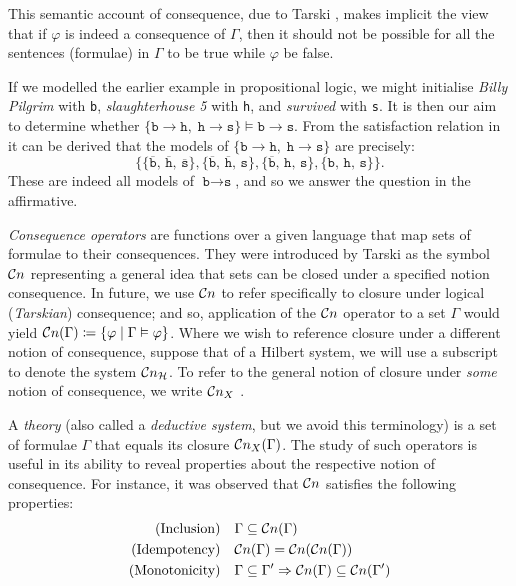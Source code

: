 This semantic account of consequence, due to Tarski , makes implicit the view that if
$\varphi$ is indeed a consequence of $\Gamma$, then it should not be possible for all the sentences (formulae) in $\Gamma$
to be true while $\varphi$ be false.

\begin{example}
	\label{example-logical-consequence} If we modelled the earlier example in propositional logic, we might initialise
	\textit{Billy Pilgrim} with \texttt{b}, \textit{slaughterhouse 5} with \texttt{h}, and \textit{survived} with \texttt{s}.
	It is then our aim to determine whether $\{\texttt{b}\rightarrow \texttt{h},\; \texttt{h}\rightarrow \texttt{s}\} \vDash
	\texttt{b}\rightarrow \texttt{s}$. From the satisfaction relation in  it can be derived
	that the models of $\{\texttt{b}\rightarrow \texttt{h},\; \texttt{h}\rightarrow \texttt{s}\}$ are precisely:
	\[
		\bigl\{ \{\overline{\texttt{b}},\,\overline{\texttt{h}},\,\overline{\texttt{s}}\}, \{\overline{\texttt{b}},\,\overline
		{\texttt{h}},\,{\texttt{s}}\}, \{\overline{\texttt{b}},\,{\texttt{h}},\,{\texttt{s}}\} , \{{\texttt{b}},\,{\texttt{h}}
		,\,{\texttt{s}}\} \bigr\}.
	\]
	These are indeed all models of $\texttt{b}\rightarrow \texttt{s}$, and so we answer the question in the affirmative.
\end{example}

\textit{Consequence operators} are functions over a given language that map sets of formulae to their consequences. They
were introduced by Tarski  as the symbol $\mathcal{C}n$ representing a general idea that sets can
be closed under a specified notion consequence. In future, we use $\mathcal{C}n$ to refer specifically to closure under logical
(\textit{Tarskian}) consequence; and so, application of the $\mathcal{C}n$ operator to a set $\Gamma$ would yield
$\mathcal{C}n (\Gamma ) \coloneqq \{\varphi \mid \Gamma \vDash \varphi\}$. Where we wish to reference closure under a different
notion of consequence, suppose that of a Hilbert system, we will use a subscript to denote the system $\mathcal{C}n_{\mathcal{H}}$.
To refer to the general notion of closure under \textit{some} notion of consequence, we write $\mathcal{C}n_{X}$
\cite[p. 4]{citkin2022consequence}.

A \textit{theory} (also called a \textit{deductive system}, but we avoid this terminology) is a set of formulae $\Gamma$
that equals its closure $\mathcal{C}n_{X}(\Gamma)$. The study of such operators is useful in its ability to reveal properties
about the respective notion of consequence. For instance, it was observed \cite{tarski1936operator} that $\mathcal{C}n$
satisfies the following properties:
%
\begin{align}
	\text{(Inclusion)}    & \quad \Gamma \subseteq \mathcal{C}n (\Gamma)                                               \\
	\text{(Idempotency)}  & \quad \mathcal{C}n (\Gamma) = \mathcal{C}n (\mathcal{C}n (\Gamma))                                       \\
	\text{(Monotonicity)} & \quad \Gamma \subseteq \Gamma' \Rightarrow \mathcal{C}n (\Gamma) \subseteq \mathcal{C}n (\Gamma')
\end{align}

